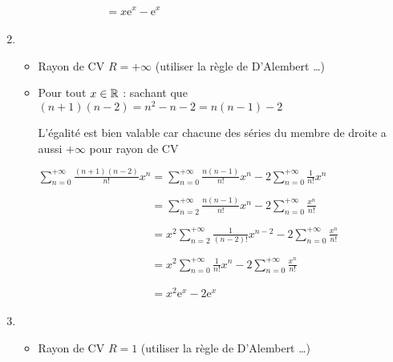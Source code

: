 \documentclass{book}
\begin{document}
\begin{Exercice}
\begin{Correction}
\begin{enumerate}
\begin{itemize}
\hspace{0.7cm} $\phantom{ \sum\limits_{n = 0}^{ + \infty } \frac{n - 1}{n!}x^n  } = x \mathrm{e}^x  -  \mathrm{e}^x $
    \end{itemize}

     
    \item %
    \begin{itemize}
    	\item Rayon de CV $R = + \infty$ (utiliser la règle de D'Alembert \dots)
    	
    	\item Pour tout $x \in \mathbb{R}$ : sachant que $(n+1)(n-2) = n^2 - n - 2 = n(n-1) - 2$
 
L'égalité est bien valable car chacune des séries du membre de droite a aussi $+ \infty$ pour rayon de CV 
    	
\hspace{0.7cm} $\sum\limits_{n = 0}^{ + \infty } \frac{(n + 1)(n - 2)}{n!}x^n  =  
\sum\limits_{n = 0}^{ + \infty } \frac{ n(n-1) }{ n! }x^n   - 2 \sum\limits_{n = 0}^{ + \infty } \frac{ 1 }{ n!} x^n  $
    	
\hspace{0.7cm} $\phantom{  \sum\limits_{n = 0}^{ + \infty } \frac{(n + 1)(n - 2)}{n!}x^n   } =  
\sum\limits_{n = 2}^{ + \infty } \frac{ n(n-1) }{ n! } x^n  - 2 \sum\limits_{n = 0}^{ + \infty } \frac{x^n}{n!}  $

\hspace{0.7cm} $\phantom{  \sum\limits_{n = 0}^{ + \infty } \frac{(n + 1)(n - 2)}{n!}x^n   } =   
x^2 \sum\limits_{n = 2}^{ + \infty } \frac{ 1 }{ (n-2) ! } x^{n-2}  - 2 \sum\limits_{n = 0}^{ + \infty } \frac{x^n}{n!}  $

\hspace{0.7cm} $\phantom{  \sum\limits_{n = 0}^{ + \infty } \frac{(n + 1)(n - 2)}{n!}x^n   } =  
x^2 \sum\limits_{n = 0}^{ + \infty } \frac{ 1 }{ n! } x^n  - 2 \sum\limits_{n = 0}^{ + \infty } \frac{x^n}{n!}  $

\hspace{0.7cm} $\phantom{  \sum\limits_{n = 0}^{ + \infty } \frac{(n + 1)(n - 2)}{n!}x^n   } = 
x^2 \mathrm{e}^x  -  2 \mathrm{e}^x $
    \end{itemize}
    


	\item %
    \begin{itemize}
    	\item Rayon de CV $R = 1$ (utiliser la règle de D'Alembert \dots)
    	

\end{itemize}
\end{enumerate}
\end{Correction}
\end{Exercice}
\end{document}
